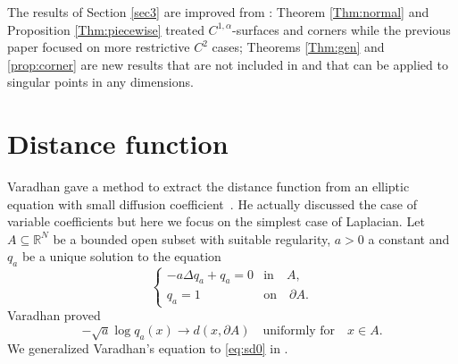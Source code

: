 \documentclass[graybox]{svmult}
\newcommand{\R}{\mathbb{R}}  %
\renewcommand{\AA}{A}  %
\begin{document}
\begin{note}
The results of Section \ref{sec3} are improved from \cite{M1}: Theorem \ref{Thm:normal} and Proposition \ref{Thm:piecewise} treated $C^{1,\alpha}$-surfaces and corners while the previous paper \cite{M1} focused on more restrictive $C^2$ cases; Theorems \ref{Thm:gen} and \ref{prop:corner} are new results that are not included in \cite{M1} and that can be applied to singular points in any dimensions. 
\end{note}











\section{Distance function}
\label{sec4}

Varadhan gave a method to extract the distance function from an elliptic equation with small diffusion coefficient~\cite{V67}.   
He actually discussed the case of variable coefficients but here we focus on the simplest case of Laplacian. 
Let $\AA \subseteq \R^N$ be a bounded open subset with suitable regularity, $a>0$ a constant and $q_a$ be a unique solution to the equation 
\begin{equation}\label{eq:Varadhan}
   \begin{cases}
-a\Delta q_a+q_a = 0 &\text{in}\quad \AA,\\
q_a=1&\text{on}\quad \partial \AA. 
\end{cases}
\end{equation}
Varadhan proved 
\begin{equation*}
-\sqrt{a} \log q_a(x) \to d(x, \partial \AA) \quad \text{uniformly for} \quad x \in \AA.
\end{equation*}
We generalized Varadhan's equation to \eqref{eq:sd0} in \cite{M}. 

\end{document}
